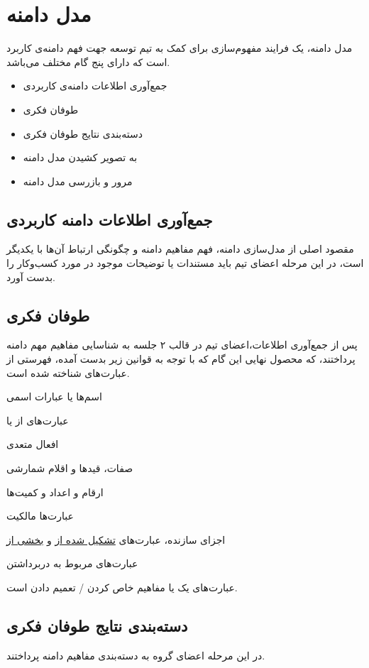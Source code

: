 \documentclass[12pt,svgnames,oneside]{book}
\newcounter{itemadded}
\let\LaTeXStandardEnumerateBegin\enumerate
\let\LaTeXStandardEnumerateEnd\endenumerate
\renewenvironment{enumerate}{%
\LaTeXStandardEnumerateBegin%
\setcounter{itemadded}{0}
}{%
\LaTeXStandardEnumerateEnd%
}%
\begin{document}
\chapter{مدل دامنه}
مدل دامنه، یک فرایند مفهوم‌سازی برای کمک به تیم توسعه جهت فهم دامنه‌ی کاربرد است که دارای پنج گام مختلف می‌باشد.
\begin{itemize}
\item
جمع‌آوری اطلاعات دامنه‌‌ی کاربردی
\item
طوفان فکری
\item
دسته‌بندی نتایج طوفان فکری
\item
به تصویر کشیدن مدل دامنه
\item
مرور و بازرسی مدل دامنه
\end{itemize}

\section{جمع‌آوری اطلاعات دامنه کاربردی}
مقصود اصلی از مدل‌سازی دامنه، فهم مفاهیم دامنه و چگونگی ارتباط آن‌ها با یکدیگر است، در این مرحله اعضای تیم باید مستندات یا توضیحات موجود در مورد کسب‌و‌کار را بدست آورد.
\section{طوفان فکری}
پس از جمع‌آوری اطلاعات،‌اعضای تیم در قالب ۲ جلسه به شناسایی مفاهیم مهم دامنه پرداختند، که محصول نهایی این گام که با توجه به قوانین زیر بدست آمده، فهرستی از عبارت‌های شناخته شده است.
\begin{enumerate}
\item
اسم‌‌ها یا عبارات اسمی
\item
عبارت‌های
 از 
یا
\item
افعال متعدی
\item
صفات، قید‌‌ها و اقلام شمارشی
\item
ارقام و اعداد و کمیت‌ها
\item
عبارت‌ها مالکیت
\item
اجزای سازنده، عبارت‌های
\underline{تشکیل شده از} و
\underline{بخشی از}
\item
عبارت‌های مربوط به دربرداشتن
\item
عبارت‌های
یک
یا مفاهیم خاص کردن / تعمیم دادن است.
\end{enumerate}

\section{دسته‌بندی نتایج طوفان فکری}
در این مرحله اعضای گروه به دسته‌بندی مفاهیم دامنه پرداختند.
\end{document}
